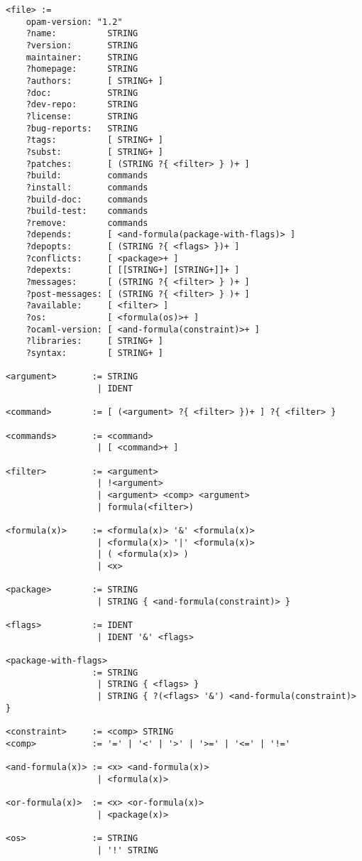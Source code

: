 \documentclass[a4paper,10pt]{article}
\begin{document}
{\small
\begin{Verbatim}[frame=single]
<file> :=
    opam-version: "1.2"
    ?name:          STRING
    ?version:       STRING
    maintainer:     STRING
    ?homepage:      STRING
    ?authors:       [ STRING+ ]
    ?doc:           STRING
    ?dev-repo:      STRING
    ?license:       STRING
    ?bug-reports:   STRING
    ?tags:          [ STRING+ ]
    ?subst:         [ STRING+ ]
    ?patches:       [ (STRING ?{ <filter> } )+ ]
    ?build:         commands
    ?install:       commands
    ?build-doc:     commands
    ?build-test:    commands
    ?remove:        commands
    ?depends:       [ <and-formula(package-with-flags)> ]
    ?depopts:       [ (STRING ?{ <flags> })+ ]
    ?conflicts:     [ <package>+ ]
    ?depexts:       [ [[STRING+] [STRING+]]+ ]
    ?messages:      [ (STRING ?{ <filter> } )+ ]
    ?post-messages: [ (STRING ?{ <filter> } )+ ]
    ?available:     [ <filter> ]
    ?os:            [ <formula(os)>+ ]
    ?ocaml-version: [ <and-formula(constraint)>+ ]
    ?libraries:     [ STRING+ ]
    ?syntax:        [ STRING+ ]

<argument>       := STRING
                  | IDENT

<command>        := [ (<argument> ?{ <filter> })+ ] ?{ <filter> }

<commands>       := <command>
                  | [ <command>+ ]

<filter>         := <argument>
                  | !<argument>
                  | <argument> <comp> <argument>
                  | formula(<filter>)

<formula(x)>     := <formula(x)> '&' <formula(x)>
                  | <formula(x)> '|' <formula(x)>
                  | ( <formula(x)> )
                  | <x>

<package>        := STRING
                  | STRING { <and-formula(constraint)> }

<flags>          := IDENT
                  | IDENT '&' <flags>

<package-with-flags>
                 := STRING
                  | STRING { <flags> }
                  | STRING { ?(<flags> '&') <and-formula(constraint)> }

<constraint>     := <comp> STRING
<comp>           := '=' | '<' | '>' | '>=' | '<=' | '!='

<and-formula(x)> := <x> <and-formula(x)>
                  | <formula(x)>

<or-formula(x)>  := <x> <or-formula(x)>
                  | <package(x)>

<os>             := STRING
                  | '!' STRING
\end{Verbatim}
}
\end{document}
